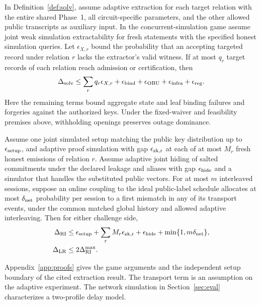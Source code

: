 \begin{theorem}
\label{thm:solv}
In Definition~\ref{def:solv}, assume adaptive extraction for each target relation with the entire shared Phase~1, all circuit-specific parameters, and the other allowed public transcripts as auxiliary input. In the concurrent-simulation game assume joint weak simulation extractability for fresh statements with the specified honest simulation queries. Let $\epsilon_{X,r}$ bound the probability that an accepting targeted record under relation $r$ lacks the extractor's valid witness. If at most $q_r$ target records of each relation reach admission or certification, then
\[
\Delta_{\rm solv}\le
\sum_r q_r\epsilon_{X,r}+\epsilon_{\rm bind}
+\epsilon_{\rm OBU}+\epsilon_{\rm infra}+\epsilon_{\rm reg}.
\]
Here the remaining terms bound aggregate state and leaf binding failures and forgeries against the authorized keys. Under the fixed-waiver and feasibility premises above, withholding openings preserves outage dominance.
\end{theorem}

\begin{theorem}
\label{thm:priv}
Assume one joint simulated setup matching the public key distribution up to $\epsilon_{\rm setup}$, and adaptive proof simulation with gap $\epsilon_{\rm zk,r}$ at each of at most $M_r$ fresh honest emissions of relation $r$. Assume adaptive joint hiding of salted commitments under the declared leakage and aliases with gap $\epsilon_{\rm hide}$ and a simulator that handles the substituted public vectors. For at most $m$ interleaved sessions, suppose an online coupling to the ideal public-label schedule allocates at most $\delta_{\rm net}$ probability per session to a first mismatch in any of its transport events, under the common matched global history and allowed adaptive interleaving. Then for either challenge side,
\[
\begin{aligned}
\Delta_{\rm RI}&\le\epsilon_{\rm setup}
 +\sum_r M_r\epsilon_{\rm zk,r}+\epsilon_{\rm hide}
 +\min\{1,m\delta_{\rm net}\},\\
\Delta_{\rm LR}&\le 2\Delta_{\rm RI}^{\max}.
\end{aligned}
\]
\end{theorem}

Appendix~\ref{app:proofs} gives the game arguments and the independent setup boundary of the cited extraction result. The transport term is an assumption on the adaptive experiment. The network simulation in Section~\ref{sec:eval} characterizes a two-profile delay model.
